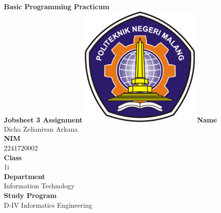 \documentclass[12pt,titlepage]{article}
\begin{document}
\begin{titlepage}
    \centering
    \vfill
    {\bfseries\LARGE
        Basic Programming Practicum\\
        \vskip0.25cm
        Jobsheet 3 Assignment
    }
    \vfill
    \includegraphics[width=6cm]{images/polinema-logo.png}
    \vfill
    {\textbf{Name}\\
        Dicha Zelianivan Arkana\\
        \vskip0.5cm
        \textbf{NIM}\\
        2241720002\\
        \vskip0.5cm
        \textbf{Class}\\
        1i\\
        \vskip0.5cm
        \textbf{Department}\\
        Information Technology\\
        \vskip0.5cm
        \textbf{Study Program}\\
        D-IV Informatics Engineering}
\end{titlepage}
\end{document}
